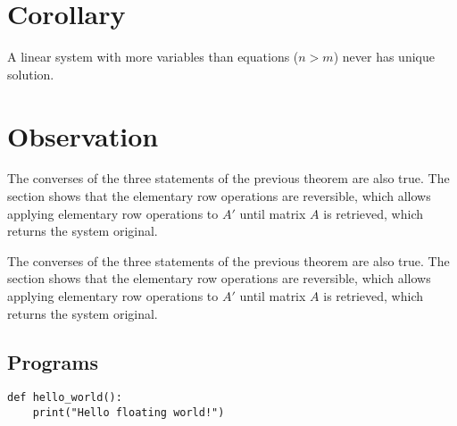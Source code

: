 \section{Corollary}
\begin{tcolorbox}
\begin{corollary}  
A linear system with more variables than equations ($n>m$) never has unique solution.
\end{corollary}%
\end{tcolorbox}%
\section{Observation}
\begin{remark} The converses of the three statements of the previous theorem are also true. The section shows that the elementary row operations are reversible, which allows applying elementary row operations to $A'$ until matrix $A$ is retrieved, which returns the system original.
\end{remark}
\begin{remarkbox}{}
\begin{remark} The converses of the three statements of the previous theorem are also true. The section shows that the elementary row operations are reversible, which allows applying elementary row operations to $A'$ until matrix $A$ is retrieved, which returns the system original.
\end{remark}
\end{remarkbox}
\lipsum[1-6]
\subsection{Programs}

\lipsum[1-6]

\begin{tcolorbox}
\vspace*{-3mm}
\begin{programa}
\begin{lstlisting}
def hello_world():
	print("Hello floating world!")
\end{lstlisting}
\end{programa}%
\vspace*{-5mm}
\end{tcolorbox}
